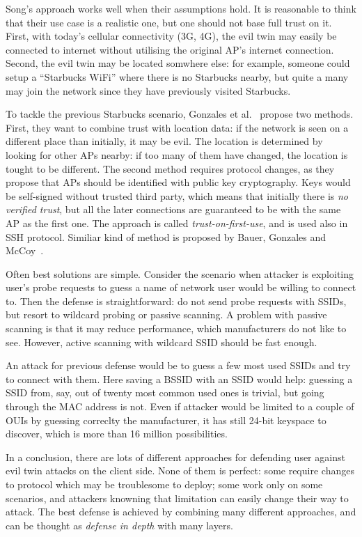 \documentclass[12pt,a4paper,oneside,pdftex]{report}
\begin{document}
Song's approach works well when their assumptions hold. It is reasonable to think that their use case is a realistic one, but one should not base full trust on it. First, with today's cellular connectivity (3G, 4G), the evil twin may easily be connected to internet without utilising the original AP's internet connection. Second, the evil twin may be located somwhere else: for example, someone could setup a ``Starbucks WiFi'' where there is no Starbucks nearby, but quite a many may join the network since they have previously visited Starbucks.

To tackle the previous Starbucks scenario, Gonzales et al.~\cite{gonzales2010practical} propose two methods. First, they want to combine trust with location data: if the network is seen on a different place than initially, it may be evil. The location is determined by looking for other APs nearby: if too many of them have changed, the location is tought to be different. The second method requires protocol changes, as they propose that APs should be identified with public key cryptography. Keys would be self-signed without trusted third party, which means that initially there is \emph{no verified trust}, but all the later connections are guaranteed to be with the same AP as the first one. The approach is called \emph{trust-on-first-use}, and is used also in SSH protocol. Similiar kind of method is proposed by Bauer, Gonzales and McCoy~\cite{bauer2008mitigating}.

Often best solutions are simple. Consider the scenario when attacker is exploiting user's probe requests to guess a name of network user would be willing to connect to. Then the defense is straightforward: do not send probe requests with SSIDs, but resort to wildcard probing or passive scanning. A problem with passive scanning is that it may reduce performance, which manufacturers do not like to see. However, active scanning with wildcard SSID should be fast enough.

An attack for previous defense would be to guess a few most used SSIDs and try to connect with them. Here saving a BSSID with an SSID would help: guessing a SSID from, say, out of twenty most common used ones is trivial, but going through the MAC address is not. Even if attacker would be limited to a couple of OUIs by guessing correclty the manufacturer, it has still 24-bit keyspace to discover, which is more than 16 million possibilities.

In a conclusion, there are lots of different approaches for defending user against evil twin attacks on the client side. None of them is perfect: some require changes to protocol which may be troublesome to deploy; some work only on some scenarios, and attackers knowning that limitation can easily change their way to attack. The best defense is achieved by combining many different approaches, and can be thought as \emph{defense in depth} with many layers.
\end{document}
